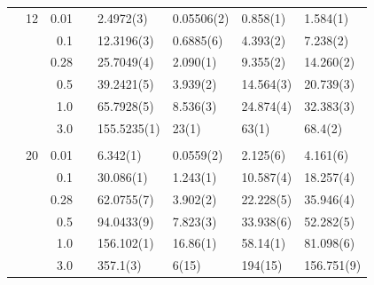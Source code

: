 \begin{table}
\begin{tabularx}{\textwidth}{R{1.5cm}rrcR{2.3cm}R{2.3cm}R{2.3cm}R{2.3cm}}
		&12 & 0.01 && 2.4972(3) & 0.05506(2) & 0.858(1) & 1.584(1)\\
		&& 0.1 && 12.3196(3) & 0.6885(6) & 4.393(2) & 7.238(2) \\
		&& 0.28 && 25.7049(4) & 2.090(1) & 9.355(2) & 14.260(2) \\
		&& 0.5 && 39.2421(5) & 3.939(2) & 14.564(3) & 20.739(3) \\
		&& 1.0 && 65.7928(5) & 8.536(3) & 24.874(4) & 32.383(3) \\
		&& 3.0 && 155.5235(1) & 23(1) & 63(1) & 68.4(2) \\ \hdashline \\
		
		&20 & 0.01 && 6.342(1) & 0.0559(2) & 2.125(6) & 4.161(6) \\
		&& 0.1 && 30.086(1) & 1.243(1) & 10.587(4) & 18.257(4) \\
		&& 0.28 && 62.0755(7) & 3.902(2) & 22.228(5) & 35.946(4) \\
		&& 0.5 && 94.0433(9) & 7.823(3) & 33.938(6) & 52.282(5) \\
		&& 1.0 && 156.102(1) & 16.86(1) & 58.14(1) & 81.098(6) \\
		&& 3.0 && 357.1(3) & 6(15) & 194(15) & 156.751(9) \\ \hline \hline
	\end{tabularx}
\end{table} 


